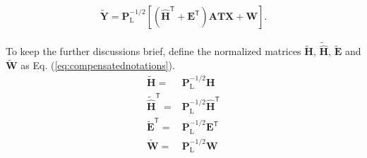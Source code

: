 \documentclass[12pt,draftclsnofoot,onecolumn,journal]{IEEEtran}
\begin{document}
%
\begin{equation}
\begin{split}
\tilde{\mathbf Y}=\mathbf P_{\mathrm L}^{-1/2}[( \hat{\mathbf H}^{\mathsf T}+\mathbf{E}^{\mathsf T})\mathbf{ATX}+\mathbf W].
 \label{eq:channelmodelwithestimationerror}
\end{split}
\end{equation}

To keep the further discussions brief, define the normalized matrices $\tilde{\mathbf H}$, $\tilde{\hat{\mathbf H}}$, $\tilde{\mathbf E}$ and $\tilde{\mathbf W}$ as  Eq. (\ref{eq:compensatednotations}).
\begin{equation}
\begin{split}
\tilde{\mathbf H}=		&\mathbf P_{\mathrm L}^{-1/2}{\mathbf H}\\
\tilde{\hat{\mathbf H}}^{\mathsf T}=	&\mathbf P_{\mathrm L}^{-1/2}{\hat{\mathbf H}}^{\mathsf T}\\
\tilde{\mathbf E}^{\mathsf T}=		&\mathbf P_{\mathrm L}^{-1/2}{\mathbf E}^{\mathsf T}\\
\tilde{\mathbf W}=		&\mathbf P_{\mathrm L}^{-1/2}{\mathbf W}
\end{split}
\label{eq:compensatednotations}
\end{equation}
\end{document}
